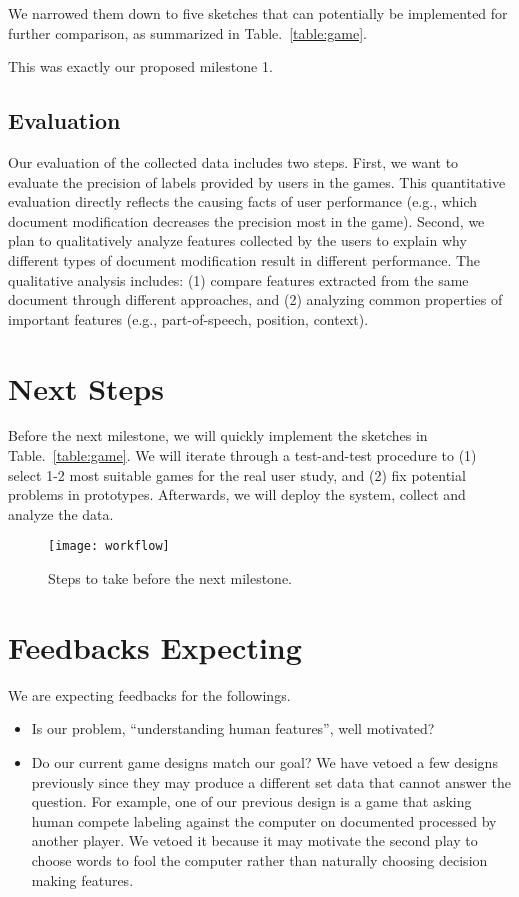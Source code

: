 \documentclass{article}
\begin{document}
We narrowed them down to five sketches that can potentially be implemented for further comparison, as summarized in Table.~\ref{table:game}.

This was exactly our proposed milestone 1.

\subsection{Evaluation} Our evaluation of the collected data includes two steps. First, we want to evaluate the precision of labels provided by users in the games. This quantitative evaluation directly reflects the causing facts of user performance (e.g., which document modification decreases the precision most in the game). Second, we plan to qualitatively analyze features collected by the users to explain why different types of document modification result in different performance. The qualitative analysis includes: (1) compare features extracted from the same document through different approaches, and (2) analyzing common properties of important features (e.g., part-of-speech, position, context).

\section{Next Steps}

Before the next milestone, we will quickly implement the sketches in Table.~\ref{table:game}. 
We will iterate through a test-and-test procedure to (1) select 1-2 most suitable games for the real user study, and (2) fix potential problems in prototypes. 
Afterwards, we will deploy the system, collect and analyze the data.

\begin{figure}[htb]
  \centering
	\texttt{[image: workflow]}
  \vspace{-3mm}
  \caption{
	Steps to take before the next milestone.}
  \label{fig:workflow}  
  \vspace{-3mm}
\end{figure}

\section{Feedbacks Expecting}

We are expecting feedbacks for the followings.
\begin{itemize}
\item Is our problem, ``understanding human features'', well motivated? 
\item Do our current game designs match our goal? We have vetoed a few designs previously since they may produce a different set data that cannot answer the question. For example, one of our previous design is a game that asking human compete labeling against the computer on documented processed by another player. We vetoed it because it may motivate the second play to choose words to fool the computer rather than naturally choosing decision making features.
\end{itemize}
\end{document}
